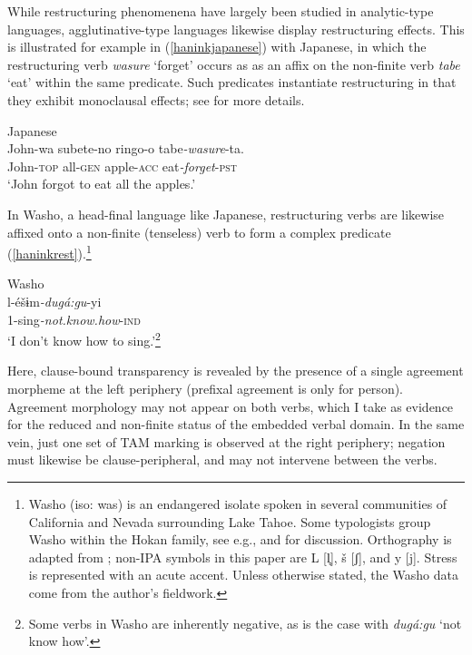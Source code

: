 \documentclass[output=paper]{langscibook}
\begin{document}
 While restructuring phenomenena have largely been studied in analytic-type languages, agglutinative-type languages likewise display restructuring effects. This is  illustrated for example in (\ref{haninkjapanese}) with Japanese, in which the restructuring verb {\itshape wasure} `forget' occurs as as an affix on the non-finite verb {\itshape tabe} `eat' within the same predicate. Such predicates instantiate restructuring in that they exhibit monoclausal effects; see \citealt{shimamurawurmbrand2014} for more details.



\ea Japanese\\
\gll 
 John-wa subete-no ringo-o tabe\textit{-wasure}-ta.\\
John-{\scshape top} all-{\scshape gen} apple-{\scshape acc} eat\textit{-forget}-{\scshape pst}\\
\glt `John forgot to eat all the apples.' \hfill \citep[2]{shimamurawurmbrand2014} \label{haninkjapanese}
\z

 
 In Washo, a head-final language like Japanese, restructuring verbs are likewise affixed onto a non-finite (tenseless) verb to form a complex predicate (\ref{haninkrest}).\footnote{Washo (iso: was) is an endangered isolate spoken in several communities of California and Nevada surrounding Lake Tahoe. Some typologists group Washo within the Hokan family, see e.g., \citet{campbell1997} and \citet{mithun1999} for discussion. Orthography is adapted from \citet{jacobsen1964}; non-IPA symbols in this paper are L [l̥], š [ʃ], and y [j]. Stress is represented with an acute accent. Unless otherwise stated, the Washo data come from the author's fieldwork.} 
 
 \ea\label{haninkrest} Washo\\
 \gll l-éšɨm\textit{-dugá:gu}-yi\\
1-sing\textit{-not.know.how}-\textsc{ind}\\ 
\glt `I don't know how to sing.'\footnote{Some verbs in Washo are inherently negative, as is the case with {\itshape dugá:gu} `not know how'.} 
\z 
 
\noindent Here, clause-bound transparency is revealed by the presence of a single agreement morpheme at the left periphery (prefixal agreement is only for person). Agreement morphology may not appear on both verbs, which I take as evidence for the reduced and non-finite status of the embedded verbal domain. In the same vein, just one set of TAM marking is observed at the right periphery;  negation must likewise be clause-peripheral, and may not intervene between the verbs.
\end{document}
